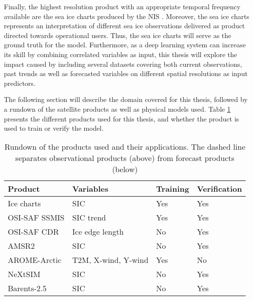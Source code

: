 \documentclass[../main/thesis.tex]{subfiles}
\begin{document}
Finally, the highest resolution product with an appropriate temporal frequency available are the sea ice charts produced by the NIS \citep{Dinessen2020}. Moreover, the sea ice charts represents an interpretation of different sea ice observations delivered as product directed towards operational users. Thus, the sea ice charts will serve as the ground truth for the model. Furthermore, as a deep learning system can increase its skill by combining correlated variables as input, this thesis will explore the impact caused by including several datasets covering both current observations, past trends as well as forecasted variables on different spatial resolutions as input predictors.

The following section will describe the domain covered for this thesis, followed by a rundown of the satellite products as well as physical models used. Table \ref{tab:data_overview} presents the different products used for this thesis, and whether the product is used to train or verify the model.

\begin{table}[]
    \caption{\label{tab:data_overview}Rundown of the products used and their applications. The dashed line separates observational products (above) from forecast products (below)}
    \centering
    \setlength{\arrayrulewidth}{0.5mm}
    \renewcommand{\arraystretch}{1.3}
    \begin{tabular}{llll}
    \hline
    Product             & Variables           & Training & Verification \\
    \hline
    Ice charts          & SIC                 & Yes      & Yes          \\
    OSI-SAF SSMIS       & SIC trend           & Yes      & Yes          \\
    OSI-SAF CDR         & Ice edge length     & No       & Yes          \\
    AMSR2               & SIC                 & No       & Yes          \\
    \hdashline
    AROME-Arctic        & T2M, X-wind, Y-wind & Yes      & No           \\
    NeXtSIM             & SIC                 & No       & Yes          \\
    Barents-2.5         & SIC                 & No       & Yes          \\
    \hline         
    \end{tabular}
\end{table}
\end{document}
